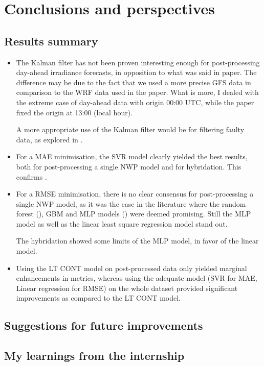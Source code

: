 \section{Conclusions and perspectives}
\subsection{Results summary}
\begin{itemize}
    \item The Kalman filter has not been proven interesting enough for post-processing day-ahead irradiance forecasts, in opposition to what was said in \cite{suksamosorn_post-processing_2021} paper. The difference may be due to the fact that we used a more precise GFS data in comparison to the WRF data used in the paper. What is more, I dealed with the extreme case of day-ahead data with origin 00:00 UTC, while the paper fixed the origin at 13:00 (local hour).

    A more appropriate use of the Kalman filter would be for filtering faulty data, as explored in \cite{sec:filtering}.
    \item For a MAE minimisation, the SVR model clearly yielded the best results, both for post-processing a single NWP model and for hybridation. This confirms \cite{verbois_statistical_2022}.
    \item For a RMSE minimisation, there is no clear consensus for post-processing a single NWP model, as it was the case in the literature where the random forest (\cite{suksamosorn_post-processing_2021}), GBM and MLP models (\cite{verbois_statistical_2022}) were deemed promising. Still the MLP model as well as the linear least square regression model stand out.

    The hybridation showed some limits of the MLP model, in favor of the linear model.
    \item Using the LT CONT model on post-processed data only yielded marginal enhancements in metrics, whereas using the adequate model (SVR for MAE, Linear regression for RMSE) on the whole dataset provided significant improvements as compared to the LT CONT model.
\end{itemize}
\subsection{Suggestions for future improvements}
\subsection{My learnings from the internship}
